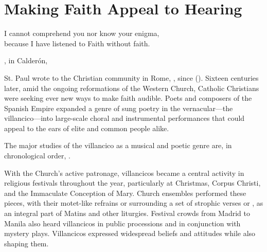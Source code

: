 %
%
%

\chapter{Making Faith Appeal to Hearing}

\label{ch:faith-hearing}

\epigraph
{I cannot comprehend you nor know your enigma,\\
because I have listened to Faith without faith.}
{, in Calderón, }

St. Paul wrote to the Christian community in Rome, , since  ().
Sixteen centuries later, amid the ongoing reformations of the Western Church, 
Catholic Christians were seeking ever new ways to make faith audible.
Poets and composers of the Spanish Empire expanded a genre of sung poetry in 
the vernacular---the villancico---into large-scale choral and instrumental 
performances that could appeal to the ears of elite and common people alike.%
\begin{Footnote}
    The major studies of the villancico as a musical and poetic genre are, in 
    chronological order, 
    \autocites{Rubio:Forma}{Laird:VC}{Torrente:PhD}{Tenorio:SorJuana}
    {CaberoPueyo:PhD}{Illari:Polychoral}{Knighton-Torrente:VCs}
    {Cashner:Cards}{Cashner:PhD}.
\end{Footnote}

With the Church's active patronage, villancicos became a central activity in 
religious festivals throughout the year, particularly at Christmas, Corpus 
Christi, and the Immaculate Conception of Mary.
Church ensembles performed these pieces, with their motet-like refrains or 
 surrounding a set of strophic verses or , as an 
integral part of Matins and other liturgies.
Festival crowds from Madrid to Manila also heard villancicos in public 
processions and in conjunction with mystery plays.
Villancicos expressed widespread beliefs and attitudes while also shaping them.

